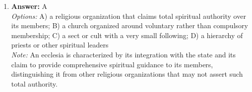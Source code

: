 \documentclass[12pt]{article}
\begin{document}
\begin{enumerate}[label=\arabic*.]
\\ \textit{Note:} The New Right often criticized trends such as cohabitation before marriage as indicative of declining family values, but they did not suggest it as evidence of this decline, which is why it is the correct answer.
\item \textbf{Answer:} A
\\ \textit{Options:} A) a religious organization that claims total spiritual authority over its members; B) a church organized around voluntary rather than compulsory membership; C) a sect or cult with a very small following; D) a hierarchy of priests or other spiritual leaders
\\ \textit{Note:} An ecclesia is characterized by its integration with the state and its claim to provide comprehensive spiritual guidance to its members, distinguishing it from other religious organizations that may not assert such total authority.
\end{enumerate}
\end{document}
